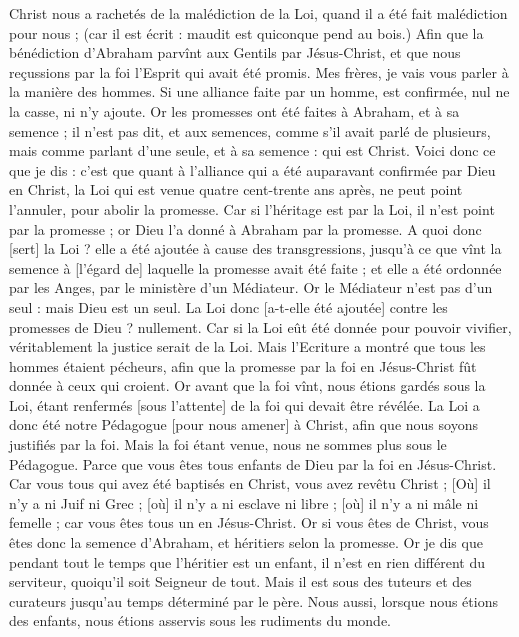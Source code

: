 \begin{multicols}{2}
Christ nous a rachetés de la malédiction de la Loi, quand il a été fait malédiction pour nous ; (car il est écrit : maudit est quiconque pend au bois.)
Afin que la bénédiction d'Abraham parvînt aux Gentils par Jésus-Christ, et que nous reçussions par la foi l'Esprit qui avait été promis.
Mes frères, je vais vous parler à la manière des hommes. Si une alliance faite par un homme, est confirmée, nul ne la casse, ni n'y ajoute.
Or les promesses ont été faites à Abraham, et à sa semence ; il n'est pas dit, et aux semences, comme s'il avait parlé de plusieurs, mais comme parlant d'une seule, et à sa semence : qui est Christ.
Voici donc ce que je dis : c'est que quant à l'alliance qui a été auparavant confirmée par Dieu en Christ, la Loi qui est venue quatre cent-trente ans après, ne peut point l'annuler, pour abolir la promesse.
Car si l'héritage est par la Loi, il n'est point par la promesse ; or Dieu l'a donné à Abraham par la promesse.
A quoi donc [sert] la Loi ? elle a été ajoutée à cause des transgressions, jusqu'à ce que vînt la semence à [l'égard de] laquelle la promesse avait été faite ; et elle a été ordonnée par les Anges, par le ministère d'un Médiateur.
Or le Médiateur n'est pas d'un seul : mais Dieu est un seul.
La Loi donc [a-t-elle été ajoutée] contre les promesses de Dieu ? nullement. Car si la Loi eût été donnée pour pouvoir vivifier, véritablement la justice serait de la Loi.
Mais l'Ecriture a montré que tous les hommes étaient pécheurs, afin que la promesse par la foi en Jésus-Christ fût donnée à ceux qui croient.
Or avant que la foi vînt, nous étions gardés sous la Loi, étant renfermés [sous l'attente] de la foi qui devait être révélée.
La Loi a donc été notre Pédagogue [pour nous amener] à Christ, afin que nous soyons justifiés par la foi.
Mais la foi étant venue, nous ne sommes plus sous le Pédagogue.
Parce que vous êtes tous enfants de Dieu par la foi en Jésus-Christ.
Car vous tous qui avez été baptisés en Christ, vous avez revêtu Christ ;
[Où] il n'y a ni Juif ni Grec ; [où] il n'y a ni esclave ni libre ; [où] il n'y a ni mâle ni femelle ; car vous êtes tous un en Jésus-Christ.
Or si vous êtes de Christ, vous êtes donc la semence d'Abraham, et héritiers selon la promesse.
\VerseOne{}Or je dis que pendant tout le temps que l'héritier est un enfant, il n'est en rien différent du serviteur, quoiqu'il soit Seigneur de tout.
Mais il est sous des tuteurs et des curateurs jusqu'au temps déterminé par le père.
Nous aussi, lorsque nous étions des enfants, nous étions asservis sous les rudiments du monde.

\end{multicols}
